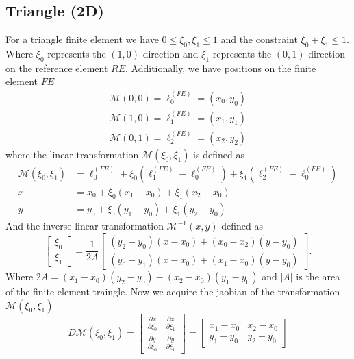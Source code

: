 \documentclass[12pt]{ociamthesis}
\begin{document}
\subsection{Triangle (2D)}
For a triangle finite element we have $0 \leq \xi_0, \xi_1 \leq 1$ and the constraint $\xi_0+\xi_1 \leq 1$. Where $\xi_0$ represents the $(1,0)$ direction and $\xi_1$ represents the $(0,1)$ direction on the reference element $RE$. Additionally, we have positions on the finite element $FE$
\begin{align}
\mathcal{M}(0,0) = \ell_0^{(FE)} = (x_0, y_0) \\
\mathcal{M}(1,0) = \ell_1^{(FE)} = (x_1, y_1) \\
\mathcal{M}(0,1) = \ell_2^{(FE)} = (x_2, y_2)
\end{align}
where the linear transformation $\mathcal{M}(\xi_0,\xi_1)$ is defined as 
\begin{align}
    \mathcal{M}(\xi_0,\xi_1) &= \ell_0^{(FE)} + \xi_0(\ell_1^{(FE)}-\ell_0^{(FE)})+ \xi_1(\ell_2^{(FE)}-\ell_0^{(FE)})\\
    x &= x_0 + \xi_0(x_1-x_0)+\xi_1(x_2-x_0) \\
    y &= y_0 + \xi_0(y_1-y_0)+\xi_1(y_2-y_0)
\end{align}
And the inverse linear transformation $\mathcal{M}^{-1}(x,y)$ defined as
\begin{equation} \label{Map_In_Tri}
\left [
\begin{matrix}
\xi_0 \\
\xi_1
\end{matrix}
\right ] =
\frac{1}{2A}
\left [
\begin{matrix}
(y_2-y_0)(x-x_0)+(x_0-x_2)(y-y_0)\\
(y_0-y_1)(x-x_0)+(x_1-x_0)(y-y_0)
\end{matrix}
\right ].
\end{equation}
Where $2A=(x_1-x_0)(y_2-y_0)-(x_2-x_0)(y_1-y_0)$ and $|A|$ is the area of the finite element traingle. Now we acquire the jaobian of the transformation $\mathcal{M}(\xi_0, \xi_1)$
\begin{equation}
D\mathcal{M}(\xi_0, \xi_1) = 
\left [
\begin{matrix}
\frac{\partial x}{\partial \xi_0} & \frac{\partial x}{\partial \xi_1} \\
\frac{\partial y}{\partial \xi_0} & \frac{\partial y}{\partial \xi_1}
\end{matrix}
\right ] = 
\left [
\begin{matrix}
x_1-x_0 & x_2-x_0 \\
y_1-y_0 & y_2-y_0
\end{matrix}
\right ]
\end{equation}
\end{document}
